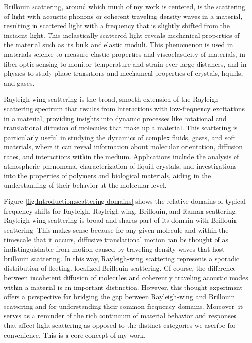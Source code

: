 Brillouin scattering, around which much of my work is centered, is the scattering of light with acoustic phonons or coherent traveling density waves in a material, resulting in scattered light with a frequency that is slightly shifted from the incident light. This inelastically scattered light reveals mechanical properties of the material such as its bulk and elastic moduli. This phenomenon is used in materials science to measure elastic properties and viscoelasticity of materials\cite{}, in fiber optic sensing to monitor temperature and strain over large distances\cite{}, and in physics to study phase transitions and mechanical properties of crystals, liquids, and gases\cite{}.

Rayleigh-wing scattering is the broad, smooth extension of the Rayleigh scattering spectrum that results from interactions with low-frequency excitations in a material, providing insights into dynamic processes like rotational and translational diffusion of molecules that make up a material. This scattering is particularly useful in studying the dynamics of complex fluids, gases, and soft materials, where it can reveal information about molecular orientation, diffusion rates, and interactions within the medium. Applications include the analysis of atmospheric phenomena\cite{}, characterization of liquid crystals\cite{}, and investigations into the properties of polymers and biological materials\cite{}, aiding in the understanding of their behavior at the molecular level.

Figure \ref{fig:Introduction:scattering-domains} shows the relative domains of typical frequency shifts for Rayleigh, Rayleigh-wing, Brillouin, and Raman scattering. Rayleigh-wing scattering is broad and shares part of its domain with Brillouin scattering. This makes sense because for any given molecule and within the timescale that it occurs, diffusive translational motion can be thought of as indistinguishable from motion caused by traveling density waves that host brillouin scattering. In this way, Rayleigh-wing scattering represents a sporadic distribution of fleeting, localized Brillouin scattering. Of course, the difference between incoherent diffusion of molecules and coherently traveling acoustic modes within a material is an important distinction. However, this thought experiment offers a perspective for bridging the gap between Rayleigh-wing and Brillouin scattering and for understanding their common frequency domains. Moreover, it serves as a reminder of the rich continuum of material behavior and responses that affect light scattering as opposed to the distinct categories we ascribe for convenience. This is a core concept of my work.%

